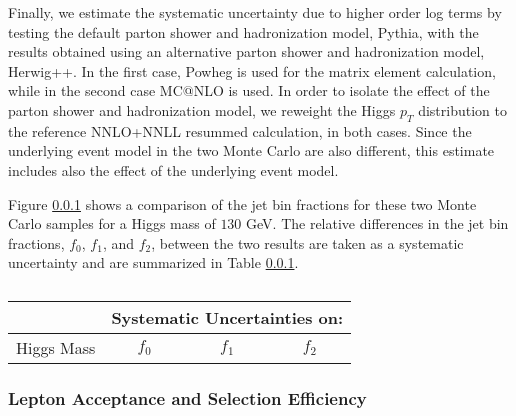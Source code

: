 
Finally, we estimate the systematic uncertainty due to higher order log terms by testing the default 
parton shower and hadronization model, Pythia, with the results obtained using an alternative
parton shower and hadronization model, Herwig++. In the first case, Powheg is used for the matrix
element calculation, while in the second case MC@NLO is used. In order to isolate the effect of the 
parton shower and hadronization model, we reweight the Higgs $p_{T}$ distribution to the reference 
NNLO+NNLL resummed calculation, in both cases. Since the underlying event model in the two Monte Carlo 
are also different, this estimate includes also the effect of the underlying event model. 

Figure \ref{} shows a comparison of the jet bin fractions for these two Monte Carlo samples
for a Higgs mass of $130$ GeV. The relative differences in the jet bin fractions,
$f_{0}$, $f_{1}$, and $f_{2}$, between the two results are taken as a systematic
uncertainty and are summarized in Table \ref{}.

\begin{table}[!htbp]
\begin{center}
\begin{tabular}{|c|c|c|c|}

\hline
               &   \multicolumn{3}{|c|}{ Systematic Uncertainties on: } \\
\hline
Higgs Mass     &   $f_{0}$   &  $f_{1}$       &   $f_{2}$       \\
\hline


\end{tabular}
\caption{  }
\label{tab:JetBinFractionSystematics_PartonShower}
\end{center}
\end{table}



\subsubsection{Lepton Acceptance and Selection Efficiency }

